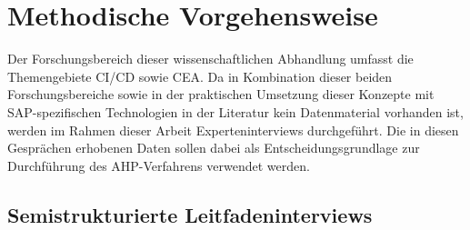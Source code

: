 \section{Methodische Vorgehensweise}

Der Forschungsbereich dieser wissenschaftlichen Abhandlung umfasst die Themengebiete CI/CD sowie CEA. Da in Kombination dieser beiden Forschungsbereiche sowie in der praktischen Umsetzung dieser Konzepte mit SAP-spezifischen Technologien in der Literatur kein Datenmaterial vorhanden ist, werden im Rahmen dieser Arbeit Experteninterviews durchgeführt. Die in diesen Gesprächen erhobenen Daten sollen dabei als Entscheidungsgrundlage zur Durchführung des AHP-Verfahrens verwendet werden.
\subsection{Semistrukturierte Leitfadeninterviews}
